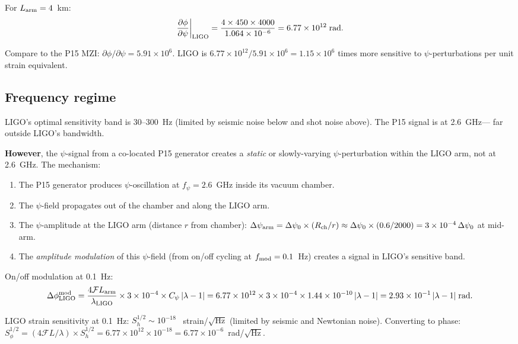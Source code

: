 \documentclass[11pt]{article}
\newcommand{\ee}[1]{\times 10^{#1}}
\newcommand{\lam}{\lambda}
\begin{document}
For $L_{\rm arm} = 4$~km:
\begin{equation}
\frac{\partial\phi}{\partial\psi}\bigg|_{\rm LIGO}
= \frac{4 \times 450 \times 4000}{1.064\ee{-6}}
= 6.77\ee{12}\;\text{rad}.
\end{equation}

Compare to the P15 MZI: $\partial\phi/\partial\psi = 5.91\ee{6}$.
LIGO is $6.77\ee{12}/5.91\ee{6} = 1.15\ee{6}$ times more sensitive
to $\psi$-perturbations per unit strain equivalent.

\subsection{Frequency regime}

LIGO's optimal sensitivity band is 30--300~Hz (limited by seismic
noise below and shot noise above). The P15 signal is at 2.6~GHz---
far outside LIGO's bandwidth.

\textbf{However}, the $\psi$-signal from a co-located P15 generator
creates a \textit{static} or slowly-varying $\psi$-perturbation
within the LIGO arm, not at 2.6~GHz. The mechanism:

\begin{enumerate}
\item The P15 generator produces $\psi$-oscillation at $f_\psi
= 2.6$~GHz inside its vacuum chamber.
\item The $\psi$-field propagates out of the chamber and along
the LIGO arm.
\item The $\psi$-amplitude at the LIGO arm (distance $r$ from
chamber): $\Delta\psi_{\rm arm} = \Delta\psi_0 \times (R_{\rm ch}/r)
\approx \Delta\psi_0 \times (0.6/2000) = 3\ee{-4}\,\Delta\psi_0$
at mid-arm.
\item The \textit{amplitude modulation} of this $\psi$-field
(from on/off cycling at $f_{\rm mod} = 0.1$~Hz) creates a signal
in LIGO's sensitive band.
\end{enumerate}

On/off modulation at 0.1~Hz:
\begin{equation}
\Delta\phi_{\rm LIGO}^{\rm mod} = \frac{4\mathcal{F}L_{\rm arm}}
{\lambda_{\rm LIGO}} \times 3\ee{-4} \times C_\psi\,|\lam-1|
= 6.77\ee{12} \times 3\ee{-4} \times 1.44\ee{-10}\,|\lam-1|
= 2.93\ee{-1}\,|\lam-1|\;\text{rad}.
\end{equation}

LIGO strain sensitivity at 0.1~Hz: $S_h^{1/2} \sim 10^{-18}$
~strain/$\sqrt{\text{Hz}}$ (limited by seismic and Newtonian noise).
Converting to phase: $S_\phi^{1/2} = (4\mathcal{F}L/\lambda)
\times S_h^{1/2} = 6.77\ee{12} \times 10^{-18}
= 6.77\ee{-6}$~rad/$\sqrt{\text{Hz}}$.
\end{document}
